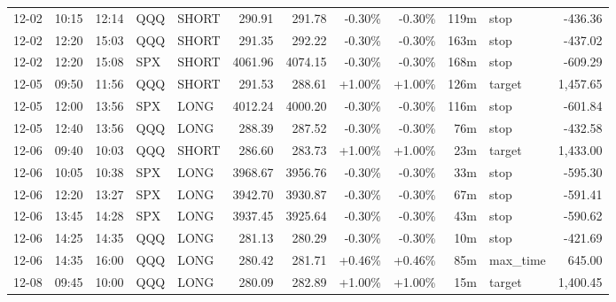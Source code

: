 \documentclass[11pt,a4paper,twoside]{article}
\begin{document}
\begin{center}
\begin{longtable}{>{\color{txtmain}}l l l l l r r r r r >{\color{txtmain}}l r}
12-02 & 10:15 & 12:14 & QQQ & SHORT & 290.91 & 291.78 & \textcolor{lossred}{-0.30\%} & \textcolor{lossred}{-0.30\%} & 119m & stop & \textcolor{lossred}{-436.36} \\
12-02 & 12:20 & 15:03 & QQQ & SHORT & 291.35 & 292.22 & \textcolor{lossred}{-0.30\%} & \textcolor{lossred}{-0.30\%} & 163m & stop & \textcolor{lossred}{-437.02} \\
12-02 & 12:20 & 15:08 & SPX & SHORT & 4061.96 & 4074.15 & \textcolor{lossred}{-0.30\%} & \textcolor{lossred}{-0.30\%} & 168m & stop & \textcolor{lossred}{-609.29} \\
12-05 & 09:50 & 11:56 & QQQ & SHORT & 291.53 & 288.61 & \textcolor{wingreen}{+1.00\%} & \textcolor{wingreen}{+1.00\%} & 126m & target & \textcolor{wingreen}{1,457.65} \\
12-05 & 12:00 & 13:56 & SPX & LONG & 4012.24 & 4000.20 & \textcolor{lossred}{-0.30\%} & \textcolor{lossred}{-0.30\%} & 116m & stop & \textcolor{lossred}{-601.84} \\
12-05 & 12:40 & 13:56 & QQQ & LONG & 288.39 & 287.52 & \textcolor{lossred}{-0.30\%} & \textcolor{lossred}{-0.30\%} & 76m & stop & \textcolor{lossred}{-432.58} \\
12-06 & 09:40 & 10:03 & QQQ & SHORT & 286.60 & 283.73 & \textcolor{wingreen}{+1.00\%} & \textcolor{wingreen}{+1.00\%} & 23m & target & \textcolor{wingreen}{1,433.00} \\
12-06 & 10:05 & 10:38 & SPX & LONG & 3968.67 & 3956.76 & \textcolor{lossred}{-0.30\%} & \textcolor{lossred}{-0.30\%} & 33m & stop & \textcolor{lossred}{-595.30} \\
12-06 & 12:20 & 13:27 & SPX & LONG & 3942.70 & 3930.87 & \textcolor{lossred}{-0.30\%} & \textcolor{lossred}{-0.30\%} & 67m & stop & \textcolor{lossred}{-591.41} \\
12-06 & 13:45 & 14:28 & SPX & LONG & 3937.45 & 3925.64 & \textcolor{lossred}{-0.30\%} & \textcolor{lossred}{-0.30\%} & 43m & stop & \textcolor{lossred}{-590.62} \\
12-06 & 14:25 & 14:35 & QQQ & LONG & 281.13 & 280.29 & \textcolor{lossred}{-0.30\%} & \textcolor{lossred}{-0.30\%} & 10m & stop & \textcolor{lossred}{-421.69} \\
12-06 & 14:35 & 16:00 & QQQ & LONG & 280.42 & 281.71 & \textcolor{wingreen}{+0.46\%} & \textcolor{wingreen}{+0.46\%} & 85m & max\_time & \textcolor{wingreen}{645.00} \\
12-08 & 09:45 & 10:00 & QQQ & LONG & 280.09 & 282.89 & \textcolor{wingreen}{+1.00\%} & \textcolor{wingreen}{+1.00\%} & 15m & target & \textcolor{wingreen}{1,400.45} \\

\end{longtable}
\end{center}
\end{document}
